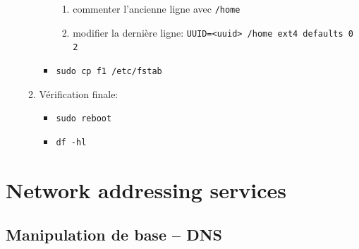 \documentclass[a4paper]{article}
\begin{document}
\begin{itemize}
\begin{example}
\begin{enumerate}
\begin{itemize}
\begin{enumerate}
                \item commenter l'ancienne ligne avec \texttt{/home}
                \item modifier la dernière ligne: \texttt{UUID=<uuid> /home ext4 defaults 0 2}
            \end{enumerate}
            \item \texttt{sudo cp f1 /etc/fstab}
        \end{itemize}
        \item Vérification finale:
        \begin{itemize}
            \item \texttt{sudo reboot}
            \item \texttt{df -hl}
        \end{itemize}
    \end{enumerate}
\end{example}

\end{itemize}















\section{Network addressing services}










\subsection{Manipulation de base -- DNS}
\end{document}
